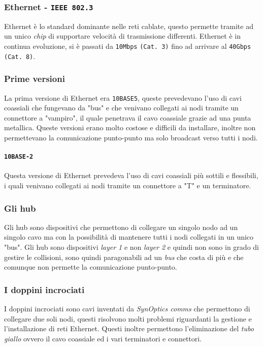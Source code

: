         \subsubsection{Ethernet - \texttt{IEEE 802.3}}
            Ethernet è lo standard dominante nelle reti cablate, questo permette tramite ad un unico \textit{chip} di supportare velocità di trasmissione differenti. Ethernet è in continua evoluzione, si è passati da \texttt{10Mbps} \texttt{(Cat. 3)} fino ad arrivare al \texttt{40Gbps} \texttt{(Cat. 8)}.
        \subsubsection{Prime versioni} La prima versione di Ethernet era \texttt{10BASE5}, queste prevedevano l'uso di cavi coassiali che fungevano da "bus" e che venivano collegati ai nodi tramite un connettore a "vampiro", il quale penetrava il cavo coassiale grazie ad una punta metallica. Queste versioni erano molto costose e difficili da installare, inoltre non permettevano la comunicazione punto-punto ma solo broadcast verso tutti i nodi.
        \paragraph{\texttt{10BASE-2}}  Questa versione di Ethernet prevedeva l'uso di cavi coassiali più sottili e flessibili, i quali venivano collegati ai nodi tramite un connettore a "T" e un terminatore. 
        \subsubsection{Gli hub} Gli hub sono dispositivi che permettono di collegare un singolo nodo ad un singolo cavo ma con la possibilità di mantenere tutti i nodi collegati in un unico "bus". Gli hub sono dispositivi \textit{layer 1} e non \textit{layer 2} e quindi non sono in grado di gestire le collisioni, sono quindi paragonabili ad un \textit{bus} che costa di più e che comunque non permette la comunicazione punto-punto.
        \subsubsection{I doppini incrociati} I doppini incrociati sono cavi inventati da \textit{SynOptics comms} che permettono di collegare due soli nodi, questi risolvono molti problemi riguardanti la gestione e l'installazione di reti Ethernet. Questi inoltre permettono l'eliminazione del \textit{tubo giallo} ovvero il cavo coassiale ed i vari terminatori e connettori.
